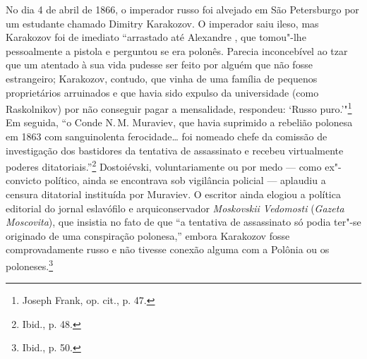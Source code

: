 No dia 4 de abril de 1866, o imperador russo foi alvejado em São
Petersburgo por um estudante chamado Dimitry Karakozov. O imperador saiu
ileso, mas Karakozov foi de imediato ``arrastado até Alexandre , que
tomou"-lhe pessoalmente a pistola e perguntou se era polonês. Parecia
inconcebível ao tzar que um atentado à sua vida pudesse ser feito por
alguém que não fosse estrangeiro; Karakozov, contudo, que vinha de uma
família de pequenos proprietários arruinados e que havia sido expulso da
universidade (como Raskolnikov) por não conseguir pagar a mensalidade,
respondeu: `Russo puro.'"\footnote{Joseph Frank, op. cit., p. 47.} Em
seguida, ``o Conde N.\,M. Muraviev, que havia suprimido a rebelião
polonesa em 1863 com sanguinolenta ferocidade\ldots{} foi nomeado chefe
da comissão de investigação dos bastidores da tentativa de assassinato e
recebeu virtualmente poderes ditatoriais.''\footnote{Ibid., p. 48.}
Dostoiévski, voluntariamente ou por medo --- como ex"-convicto político,
ainda se encontrava sob vigilância policial --- aplaudiu a censura
ditatorial instituída por Muraviev. O escritor ainda elogiou a política
editorial do jornal eslavófilo e arquiconservador \textit{Moskovskii
Vedomosti} (\textit{Gazeta Moscovita}), que insistia no fato de que ``a
tentativa de assassinato só podia ter"-se originado de uma conspiração
polonesa,'' embora Karakozov fosse comprovadamente russo e não tivesse
conexão alguma com a Polônia ou os poloneses.\footnote{Ibid., p. 50.}

